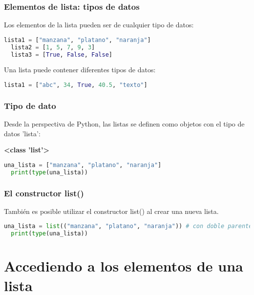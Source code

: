 \begin{frame}[fragile]
  \frametitle{Elementos de lista: tipos de datos}

  Los elementos de la lista pueden ser de cualquier tipo de datos:

  \vspace{\baselineskip}
  \begin{lstlisting}[language=Python]
  lista1 = ["manzana", "platano", "naranja"]
  lista2 = [1, 5, 7, 9, 3]
  lista3 = [True, False, False]
  \end{lstlisting}

  \pausa
  Una lista puede contener diferentes tipos de datos:
  \vspace{\baselineskip}
  \begin{lstlisting}[language=Python]
  lista1 = ["abc", 34, True, 40.5, "texto"]
  \end{lstlisting}
\end{frame}

\begin{frame}[fragile]
  \frametitle{Tipo de dato}

  Desde la perspectiva de Python, las listas se definen
  como objetos con el tipo de datos 'lista':

  \vspace{\baselineskip}
  \textbf{<class 'list'>}

  \vspace{\baselineskip}
  \begin{lstlisting}[language=Python]
  una_lista = ["manzana", "platano", "naranja"]
  print(type(una_lista)) 
  \end{lstlisting}
\end{frame}

\begin{frame}[fragile]
  \frametitle{El constructor list()}

  También es posible utilizar el constructor
  \textcolor{codeKeyword2}{list}() al crear una nueva lista. 

  \vspace{\baselineskip}
  \begin{lstlisting}[language=Python]
  una_lista = list(("manzana", "platano", "naranja")) # con doble parentesis
  print(type(una_lista)) 
  \end{lstlisting}
\end{frame}

\section{Accediendo a los elementos de una lista}

